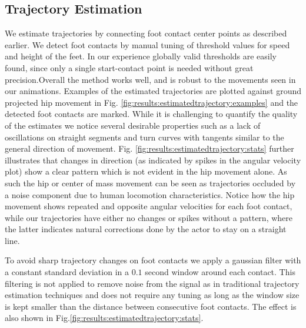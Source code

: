 \subsection{Trajectory Estimation}
We estimate trajectories by connecting foot contact center points as described earlier. We detect foot contacts by manual tuning of threshold values for speed and height of the feet. In our experience globally valid thresholds are easily found, since only a single start-contact point is needed without great precision.Overall the method works well, and is robust to the movements seen in our animations. Examples of the estimated trajectories are plotted against ground projected hip movement in Fig. \ref{fig:results:estimatedtrajectory:examples} and the detected foot contacts are marked. While it is challenging to quantify the quality of the estimates we notice several desirable properties such as a lack of oscillations on straight segments and turn curves with tangents similar to the general direction of movement. Fig. \ref{fig:results:estimatedtrajectory:stats} further illustrates that changes in direction (as indicated by spikes in the angular velocity plot) show a clear pattern  which is not evident in the hip movement alone. As such the hip or center of mass movement can be seen as trajectories occluded by a noise component due to human locomotion characteristics. Notice how the hip movement shows repeated and opposite angular velocities for each foot contact, while our trajectories have either no changes or spikes without a pattern, where the latter indicates natural corrections done by the actor to stay on a straight line. 

To avoid sharp trajectory changes on foot contacts we apply a gaussian filter with a constant standard deviation in a $0.1$ second window around each contact. This filtering is not applied to remove noise from the signal as in traditional trajectory estimation techniques and does not require any tuning as long as the window size is kept smaller than the distance between consecutive foot contacts. The effect is also shown in Fig.\ref{fig:results:estimatedtrajectory:stats}.   


